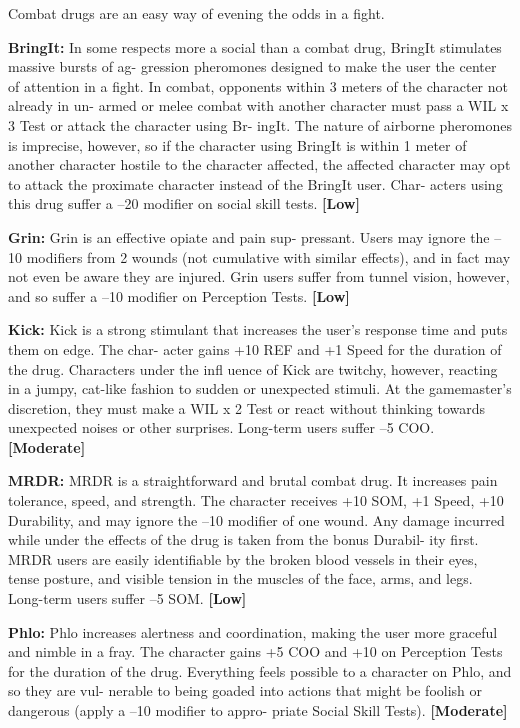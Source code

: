 Combat drugs are an easy way of evening the odds 
in a fight.

\textbf{BringIt:} In some respects more a social than a 
combat drug, BringIt stimulates massive bursts of ag-
gression pheromones designed to make the user the 
center of attention in a fight. In combat, opponents 
within 3 meters of the character not already in un-
armed or melee combat with another character must 
pass a WIL x 3 Test or attack the character using Br-
ingIt. The nature of airborne pheromones is imprecise, 
however, so if the character using BringIt is within 
1 meter of another character hostile to the character 
affected, the affected character may opt to attack the 
proximate character instead of the BringIt user. Char-
acters using this drug suffer a –20 modifier on social 
skill tests. \textbf{[Low]}

\textbf{Grin:} Grin is an effective opiate and pain sup-
pressant. Users may ignore the –10 modifiers from 
2 wounds (not cumulative with similar effects), and 
in fact may not even be aware they are injured. Grin 
users suffer from tunnel vision, however, and so suffer 
a –10 modifier on Perception Tests. \textbf{[Low]}

\textbf{Kick:} Kick is a strong stimulant that increases the 
user's response time and puts them on edge. The char-
acter gains +10 REF and +1 Speed for the duration of 
the drug. Characters under the infl uence of Kick are 
twitchy, however, reacting in a jumpy, cat-like fashion 
to sudden or unexpected stimuli. At the gamemaster's 
discretion, they must make a WIL x 2 Test or react 
without thinking towards unexpected noises or other 
surprises. Long-term users suffer –5 COO. \textbf{[Moderate]}

\textbf{MRDR:  }MRDR is a straightforward and brutal 
combat drug. It increases pain tolerance, speed, and 
strength. The character receives +10 SOM, +1 Speed, 
+10 Durability, and may ignore the –10 modifier of 
one wound. Any damage incurred while under the 
effects of the drug is taken from the bonus Durabil-
ity first. MRDR users are easily identifiable by the 
broken blood vessels in their eyes, tense posture, and 
visible tension in the muscles of the face, arms, and 
legs. Long-term users suffer –5 SOM. \textbf{[Low]}

\textbf{Phlo:} Phlo increases alertness and coordination, 
making the user more graceful and nimble in a fray. 
The character gains +5 COO and +10 on Perception 
Tests for the duration of the drug. Everything feels 
possible to a character on Phlo, and so they are vul-
nerable to being goaded into actions that might be 
foolish or dangerous (apply a –10 modifier to appro-
priate Social Skill Tests). \textbf{[Moderate]}

